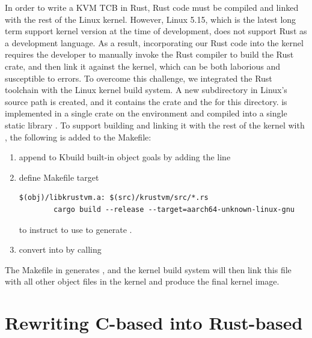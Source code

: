 In order to write a KVM TCB in Rust, Rust code must be compiled and linked with
the rest of the Linux kernel.
However, Linux 5.15, which is the latest long term support kernel version at
the time of \rustsec{} development, does not support Rust as a development
language. As a result, incorporating our Rust code into the kernel requires
the developer to manually invoke the Rust compiler to build the Rust crate, and
then link it against the kernel, which can be both laborious and susceptible to
errors.
To overcome this challenge, we integrated the Rust toolchain with the Linux
kernel build system. A new subdirectory in Linux's source path
 is created, and it contains the \rustcore{} crate
and the  for this directory.
\rustcore{} is implemented in a single crate on the  environment
and compiled into a single static library .
To support building  and linking it with the
rest of the kernel with , the following is added to the Makefile:
\begin{enumerate}
\item{append  to Kbuild built-in object goals  by adding the line }
\item{define Makefile target
\begin{listing}[hbtp]
    \begin{verbatim}
$(obj)/libkrustvm.a: $(src)/krustvm/src/*.rs
        cargo build --release --target=aarch64-unknown-linux-gnu
    \end{verbatim}
    \label{lst:Makefile}
    \vspace{-1.2cm}
\end{listing}
to instruct  to use  to generate .
}
\item{convert  into  by calling }
\end{enumerate}
The Makefile in  generates ,
and the kernel build system will then link this file with all other object
files in the kernel and produce the final kernel image.

\section{Rewriting C-based \secore{} into Rust-based \rustcore{}}

%

